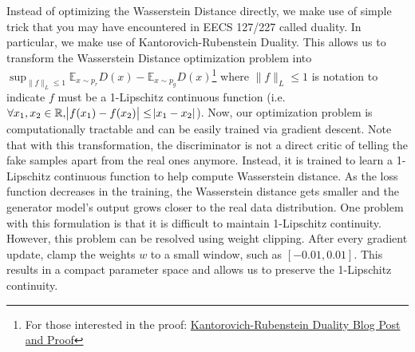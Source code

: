 Instead of optimizing the Wasserstein Distance directly, we make use of simple trick that you may have encountered in EECS 127/227 called duality. In particular, we make use of Kantorovich-Rubenstein Duality. This allows us to transform the Wasserstein Distance optimization problem into $\sup_{\lVert f \rVert_{L} \leq 1} \mathbb{E}_{x \sim p_{r}} D(x) - \mathbb{E}_{x \sim p_{g}} D(x)$\footnote{For those interested in the proof: \href{https://vincentherrmann.github.io/blog/wasserstein/}{Kantorovich-Rubenstein Duality Blog Post and Proof}} where $\lVert f \rVert_{L} \leq 1$ is notation to indicate $f$ must be a 1-Lipschitz continuous function (i.e. $\forall x_{1}, x_{2} \in \mathbb{R}, \abs{f(x_{1}) - f(x_{2})} \leq \abs{x_{1} - x_{2}}$). Now, our optimization problem is computationally tractable and can be easily trained via gradient descent. Note that with this transformation, the discriminator is not a direct critic of telling the fake samples apart from the real ones anymore. Instead, it is trained to learn a 1-Lipschitz continuous function to help compute Wasserstein distance. As the loss function decreases in the training, the Wasserstein distance gets smaller and the generator model’s output grows closer to the real data distribution. One problem with this formulation is that it is difficult to maintain 1-Lipschitz continuity. However, this problem can be resolved using weight clipping. After every gradient update, clamp the weights $w$ to a small window, such as $[-0.01, 0.01]$. This results in a compact parameter space and allows us to preserve the 1-Lipschitz continuity.
